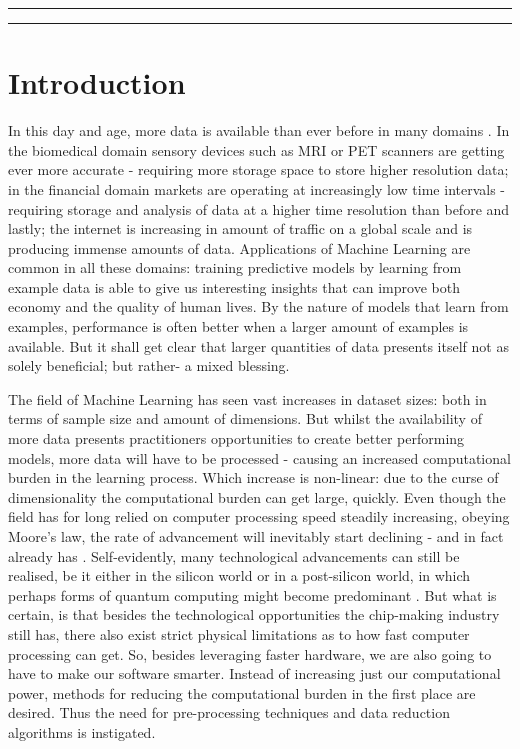 \documentclass{article}
\begin{document}
\hrule
\begin{abstract}
\end{abstract}
\hrule
\begin{quote}
    
\end{quote}

\tableofcontents

\newpage
\section{Introduction}\label{section:introduction}
In this day and age, more data is available than ever before in many domains \citep{sagiroglu_big_2013}. In the biomedical domain sensory devices such as MRI or PET scanners are getting ever more accurate - requiring more storage space to store higher resolution data; in the financial domain markets are operating at increasingly low time intervals - requiring storage and analysis of data at a higher time resolution than before and lastly; the internet is increasing in amount of traffic on a global scale and is producing immense amounts of data. Applications of Machine Learning are common in all these domains: training predictive models by learning from example data is able to give us interesting insights that can improve both economy and the quality of human lives. By the nature of models that learn from examples, performance is often better when a larger amount of examples is available. But it shall get clear that larger quantities of data presents itself not as solely beneficial; but rather- a mixed blessing.

The field of Machine Learning has seen vast increases in dataset sizes: both in terms of sample size and amount of dimensions. But whilst the availability of more data presents practitioners opportunities to create better performing models, more data will have to be processed - causing an increased computational burden in the learning process. Which increase is non-linear: due to the curse of dimensionality the computational burden can get large, quickly. Even though the field has for long relied on computer processing speed steadily increasing, obeying Moore's law, the rate of advancement will inevitably start declining - and in fact already has \citep{theis_end_2017}. Self-evidently, many technological advancements can still be realised, be it either in the silicon world or in a post-silicon world, in which perhaps forms of quantum computing might become predominant \citep{britt_high-performance_2017}. But what is certain, is that besides the technological opportunities the chip-making industry still has, there also exist strict physical limitations as to how fast computer processing can get. So, besides leveraging faster hardware, we are also going to have to make our software smarter. Instead of increasing just our computational power, methods for reducing the computational burden in the first place are desired. Thus the need for pre-processing techniques and data reduction algorithms is instigated.
\end{document}
